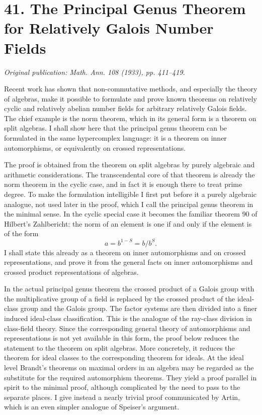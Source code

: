 \documentclass[12pt]{article}
\begin{document}
\section{41. The Principal Genus Theorem for Relatively Galois Number Fields}

\textit{Original publication: Math. Ann. 108 (1933), pp. 411--419.}

Recent work has shown that non-commutative methods, and especially the theory of algebras, make it possible to formulate and prove known theorems on relatively cyclic and relatively abelian number fields for arbitrary relatively Galois fields. The chief example is the norm theorem, which in its general form is a theorem on split algebras. I shall show here that the principal genus theorem can be formulated in the same hypercomplex language: it is a theorem on inner automorphisms, or equivalently on crossed representations.

The proof is obtained from the theorem on split algebras by purely algebraic and arithmetic considerations. The transcendental core of that theorem is already the norm theorem in the cyclic case, and in fact it is enough there to treat prime degree. To make the formulation intelligible I first put before it a purely algebraic analogue, not used later in the proof, which I call the principal genus theorem in the minimal sense. In the cyclic special case it becomes the familiar theorem 90 of Hilbert's Zahlbericht: the norm of an element is one if and only if the element is of the form
\[
  a=b^{1-S}=b/b^S .
\]
I shall state this already as a theorem on inner automorphisms and on crossed representations, and prove it from the general facts on inner automorphisms and crossed product representations of algebras.

In the actual principal genus theorem the crossed product of a Galois group with the multiplicative group of a field is replaced by the crossed product of the ideal-class group and the Galois group. The factor systems are then divided into a finer induced ideal-class classification. This is the analogue of the ray-class division in class-field theory. Since the corresponding general theory of automorphisms and representations is not yet available in this form, the proof below reduces the statement to the theorem on split algebras. More concretely, it reduces the theorem for ideal classes to the corresponding theorem for ideals. At the ideal level Brandt's theorems on maximal orders in an algebra may be regarded as the substitute for the required automorphism theorems. They yield a proof parallel in spirit to the minimal proof, although complicated by the need to pass to the separate places. I give instead a nearly trivial proof communicated by Artin, which is an even simpler analogue of Speiser's argument.
\end{document}
